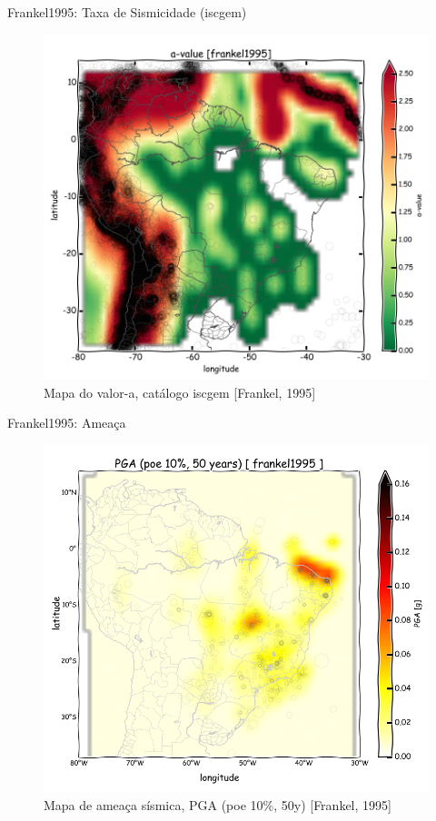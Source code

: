\documentclass[ucs,8pt]{beamer}
\begin{document}
\begin{frame}{Frankel1995: Taxa de Sismicidade (\gls{iscgem})}
\begin{figure}[H]
  \centering
  \includegraphics[height=.95\textheight]{a_frankel_sa} 
  \caption{Mapa do valor-a, catálogo \gls{iscgem} [Frankel, 1995] }
  \label{fig:a_fran_sa} 
\end{figure}
\end{frame}


\begin{frame}{Frankel1995: Ameaça}
\begin{figure}[H]
  \centering
  \includegraphics[height=.95\textheight]{pga_frankel} 
  \caption{Mapa de ameaça sísmica, PGA (poe 10\%, 50y) [Frankel, 1995] }
  \label{fig:pga_fran} 
\end{figure}
\end{frame}
\end{document}
